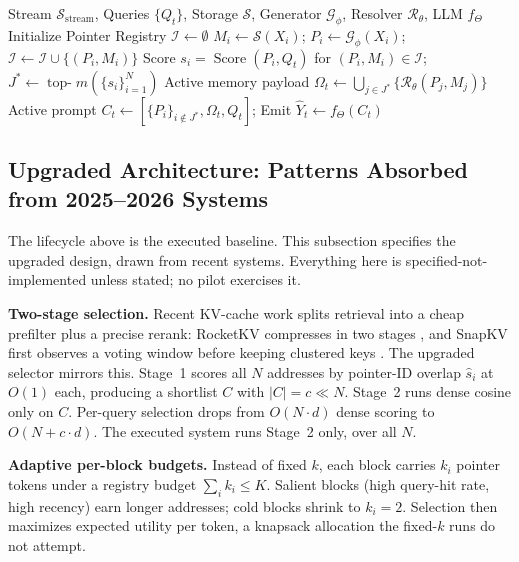 \documentclass[conference]{IEEEtran}
\begin{document}
\begin{algorithm}[t]
\caption{Lifecycle of SemPointer Addressing and Resolution.}\label{alg:sempointer}
\begin{algorithmic}[1]
\footnotesize
\REQUIRE Stream $\mathcal{S}_{\text{stream}}$, Queries $\{Q_t\}$, Storage $\mathcal{S}$, Generator $\mathcal{G}_{\phi}$, Resolver $\mathcal{R}_{\theta}$, LLM $f_{\Theta}$
\STATE Initialize Pointer Registry $\mathcal{I} \leftarrow \emptyset$
    \STATE $M_i \leftarrow \mathcal{S}(X_i)$; \quad $P_i \leftarrow \mathcal{G}_{\phi}(X_i)$; \quad $\mathcal{I} \leftarrow \mathcal{I} \cup \{(P_i, M_i)\}$
\ENDFOR
{}
    \STATE Score $s_i = \operatorname{Score}(P_i, Q_t)$ for $(P_i, M_i) \in \mathcal{I}$; \quad $J^* \leftarrow \operatorname{top-}m(\{s_i\}_{i=1}^N)$
    \STATE Active memory payload $\Omega_t \leftarrow \bigcup_{j \in J^*} \{\mathcal{R}_{\theta}(P_j, M_j)\}$
    \STATE Active prompt $C_t \leftarrow [\{P_i\}_{i \notin J^*}, \Omega_t, Q_t]$; \quad Emit $\hat{Y}_t \leftarrow f_{\Theta}(C_t)$
\ENDFOR
\end{algorithmic}
\end{algorithm}

\subsection{Upgraded Architecture: Patterns Absorbed from 2025--2026 Systems}
The lifecycle above is the executed baseline. This subsection specifies the upgraded design, drawn from recent systems. Everything here is specified-not-implemented unless stated; no pilot exercises it.

\noindent\textbf{Two-stage selection.} Recent KV-cache work splits retrieval into a cheap prefilter plus a precise rerank: RocketKV compresses in two stages \cite{behnam2025rocketkv}, and SnapKV first observes a voting window before keeping clustered keys \cite{li2024snapkv}. The upgraded selector mirrors this. Stage~1 scores all $N$ addresses by pointer-ID overlap $\hat{s}_i$ at $O(1)$ each, producing a shortlist $C$ with $|C| = c \ll N$. Stage~2 runs dense cosine only on $C$. Per-query selection drops from $O(N{\cdot}d)$ dense scoring to $O(N + c{\cdot}d)$. The executed system runs Stage~2 only, over all $N$.

\noindent\textbf{Adaptive per-block budgets.} Instead of fixed $k$, each block carries $k_i$ pointer tokens under a registry budget $\sum_i k_i \le K$. Salient blocks (high query-hit rate, high recency) earn longer addresses; cold blocks shrink to $k_i = 2$. Selection then maximizes expected utility per token, a knapsack allocation the fixed-$k$ runs do not attempt.
\end{document}
